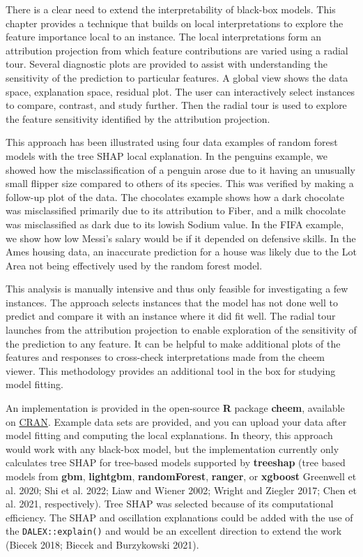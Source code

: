 \documentclass[
]{article}
\begin{document}
There is a clear need to extend the interpretability of black-box
models. This chapter provides a technique that builds on local
interpretations to explore the feature importance local to an instance.
The local interpretations form an attribution projection from which
feature contributions are varied using a radial tour. Several diagnostic
plots are provided to assist with understanding the sensitivity of the
prediction to particular features. A global view shows the data space,
explanation space, residual plot. The user can interactively select
instances to compare, contrast, and study further. Then the radial tour
is used to explore the feature sensitivity identified by the attribution
projection.

This approach has been illustrated using four data examples of random
forest models with the tree SHAP local explanation. In the penguins
example, we showed how the misclassification of a penguin arose due to
it having an unusually small flipper size compared to others of its
species. This was verified by making a follow-up plot of the data. The
chocolates example shows how a dark chocolate was misclassified
primarily due to its attribution to Fiber, and a milk chocolate was
misclassified as dark due to its lowish Sodium value. In the FIFA
example, we show how low Messi's salary would be if it depended on
defensive skills. In the Ames housing data, an inaccurate prediction for
a house was likely due to the Lot Area not being effectively used by the
random forest model.

This analysis is manually intensive and thus only feasible for
investigating a few instances. The approach selects instances that the
model has not done well to predict and compare it with an instance where
it did fit well. The radial tour launches from the attribution
projection to enable exploration of the sensitivity of the prediction to
any feature. It can be helpful to make additional plots of the features
and responses to cross-check interpretations made from the cheem viewer.
This methodology provides an additional tool in the box for studying
model fitting.

An implementation is provided in the open-source \textbf{R} package
\textbf{cheem}, available on
\href{https://CRAN.R-project.org/package=cheem}{CRAN}. Example data sets
are provided, and you can upload your data after model fitting and
computing the local explanations. In theory, this approach would work
with any black-box model, but the implementation currently only
calculates tree SHAP for tree-based models supported by
\textbf{treeshap} (tree based models from \textbf{gbm},
\textbf{lightgbm}, \textbf{randomForest}, \textbf{ranger}, or
\textbf{xgboost} Greenwell et al. 2020; Shi et al. 2022; Liaw and Wiener
2002; Wright and Ziegler 2017; Chen et al. 2021, respectively). Tree
SHAP was selected because of its computational efficiency. The SHAP and
oscillation explanations could be added with the use of the
\texttt{DALEX::explain()} and would be an excellent direction to extend
the work (Biecek 2018; Biecek and Burzykowski 2021).
\end{document}
